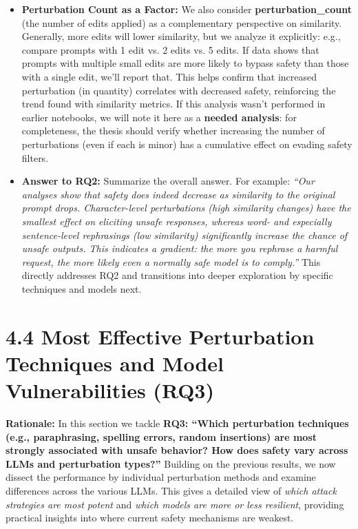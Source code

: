 \begin{itemize}
  \item \textbf{Perturbation Count as a Factor:} We also consider \textbf{perturbation\_count} (the number of edits applied) as a complementary perspective on similarity. Generally, more edits will lower similarity, but we analyze it explicitly: e.g., compare prompts with 1 edit vs. 2 edits vs. 5 edits. If data shows that prompts with multiple small edits are more likely to bypass safety than those with a single edit, we’ll report that. This helps confirm that increased perturbation (in quantity) correlates with decreased safety, reinforcing the trend found with similarity metrics. If this analysis wasn’t performed in earlier notebooks, we will note it here as a \textbf{needed analysis}: for completeness, the thesis should verify whether increasing the number of perturbations (even if each is minor) has a cumulative effect on evading safety filters.

  \item \textbf{Answer to RQ2:} Summarize the overall answer. For example: \textit{“Our analyses show that safety does indeed decrease as similarity to the original prompt drops. Character\--level perturbations (high similarity changes) have the smallest effect on eliciting unsafe responses, whereas word\-- and especially sentence\--level rephrasings (low similarity) significantly increase the chance of unsafe outputs. This indicates a gradient: the more you rephrase a harmful request, the more likely even a normally safe model is to comply.”} This directly addresses RQ2 and transitions into deeper exploration by specific techniques and models next.
\end{itemize}

\section{4.4 Most Effective Perturbation Techniques and Model Vulnerabilities (RQ3)}
\textbf{Rationale:} In this section we tackle \textbf{RQ3: “Which perturbation techniques (e.g., paraphrasing, spelling errors, random insertions) are most strongly associated with unsafe behavior? How does safety vary across LLMs and perturbation types?”} Building on the previous results, we now dissect the performance by individual perturbation methods and examine differences across the various LLMs. This gives a detailed view of \textit{which attack strategies are most potent} and \textit{which models are more or less resilient}, providing practical insights into where current safety mechanisms are weakest.

